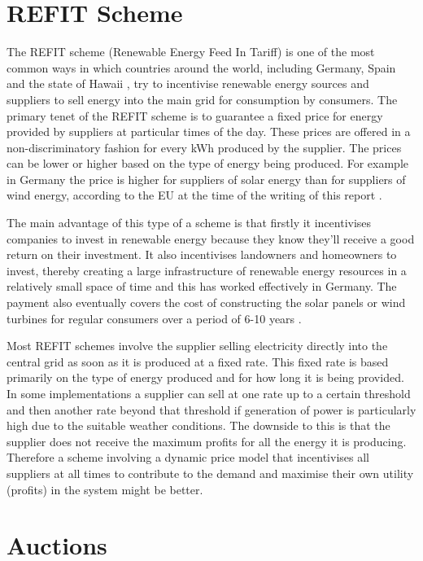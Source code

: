 \documentclass[a4paper, notitlepage]{report}
\begin{document}
\chapter{REFIT Scheme}
\label{sec:org0f476ac}
The REFIT scheme (Renewable Energy Feed In Tariff) is one of the most common
ways in which countries around the world, including Germany, Spain and the state
of Hawaii \cite{couture2010analysis}, try to incentivise renewable energy sources
and suppliers to sell energy into the main grid for consumption by consumers.
The primary tenet of the REFIT scheme is to guarantee a fixed price for energy
provided by suppliers at particular times of the day. These prices are offered
in a non-discriminatory fashion for every kWh produced by the supplier. The
prices can be lower or higher based on the type of energy being produced. For
example in Germany the price is higher for suppliers of solar energy than for
suppliers of wind energy, according to the EU at the time of the writing of this
report \cite{refit_germany}.

The main advantage of this type of a scheme is that firstly it incentivises
companies to invest in renewable energy because they know they’ll receive a good
return on their investment. It also incentivises landowners and homeowners to
invest, thereby creating a large infrastructure of renewable energy resources in
a relatively small space of time and this has worked effectively in Germany. The
payment also eventually covers the cost of constructing the solar panels or wind
turbines for regular consumers over a period of 6-10 years \cite{lauber2004refit}. 

Most REFIT schemes involve the supplier selling electricity directly into the
central grid as soon as it is produced at a fixed rate. This fixed rate is based
primarily on the type of energy produced and for how long it is being provided.
In some implementations a supplier can sell at one rate up to a certain
threshold and then another rate beyond that threshold if generation of power is
particularly high due to the suitable weather conditions. The downside to this
is that the supplier does not receive the maximum profits for all the energy it
is producing. Therefore a scheme involving a dynamic price model that incentivises
all suppliers at all times to contribute to the demand and maximise their own
utility (profits) in the system might be better.
\chapter{Auctions}
\label{sec:orgeadd596}
\end{document}

